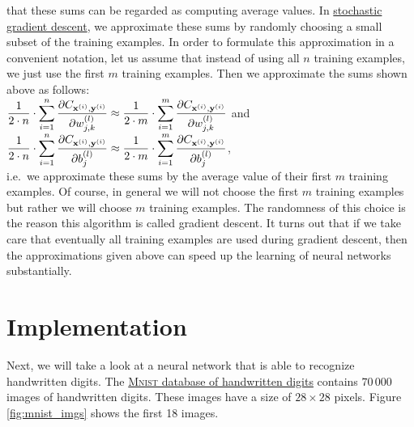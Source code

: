 that these sums can be regarded as computing average values.  In  
\href{https://en.wikipedia.org/wiki/Stochastic_gradient_descent}{stochastic gradient descent},
we approximate these sums by randomly choosing a small subset of the training examples.  In
order to formulate this approximation in a convenient notation, let us assume that instead of using all $n$
training examples, we just use the first $m$ training examples.  Then we approximate the sums shown above as follows:
\\[0.2cm]
\hspace*{1.3cm}
$\displaystyle \frac{1}{2\cdot n} \cdot \sum\limits_{i=1}^n \frac{\partial C_{\mathbf{x}^{(i)}, \mathbf{y}^{(i)}}}{\partial w_{j,k}^{(l)}}
 \approx
 \frac{1}{2\cdot m} \cdot \sum\limits_{i=1}^m \frac{\partial C_{\mathbf{x}^{(i)}, \mathbf{y}^{(i)}}}{\partial w_{j,k}^{(l)}}
$
\quad and \quad
$\displaystyle \frac{1}{2\cdot n} \cdot \sum\limits_{i=1}^n \frac{\partial C_{\mathbf{x}^{(i)}, \mathbf{y}^{(i)}}}{\partial b_{j}^{(l)}}
     \approx
     \frac{1}{2\cdot m} \cdot \sum\limits_{i=1}^m \frac{\partial C_{\mathbf{x}^{(i)}, \mathbf{y}^{(i)}}}{\partial b_{j}^{(l)}}
$,
\\[0.2cm]
i.e.~we approximate these sums by the average value of their first $m$ training examples.
Of course, in general we will not choose the first $m$ training examples but rather we will choose $m$ 
training examples.  The randomness of this choice is the reason this algorithm is called 
gradient descent.  It turns out that if we take care that eventually all training examples are used during
gradient descent, then the approximations given above can speed up the learning of neural networks substantially.

\section{Implementation}
Next, we will take a look at a neural network that is able to recognize handwritten digits.  The
\href{http://yann.lecun.com/exdb/mnist/}{\textsc{Mnist} database of handwritten digits}
contains $70\,000$ images of handwritten digits. These images have a size of $28 \times 28$ pixels.
Figure \ref{fig:mnist_imgs} shows the first 18 images. 

